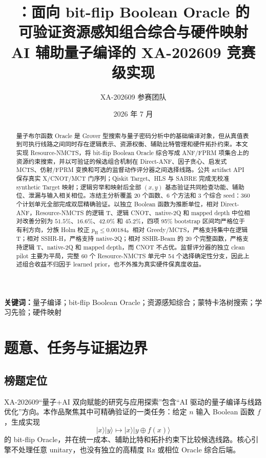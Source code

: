 \documentclass[UTF8,a4paper,12pt]{ctexart}
\title{\method{}：面向 bit-flip Boolean Oracle 的\\
可验证资源感知组合综合与硬件映射\\[0.5em]
{\large AI 辅助量子编译的 XA-202609 竞赛级实现}}
\author{XA-202609 参赛团队}
\date{2026 年 7 月}
\newcommand{\xor}{\ensuremath{\oplus}}
\newcommand{\method}{Resource-NMCTS}
\begin{document}
\maketitle

\begin{abstract}
量子布尔函数 Oracle 是 Grover 型搜索与量子密码分析中的基础编译对象，但从真值表到可执行线路之间同时存在逻辑表示、资源权衡、辅助比特管理和硬件拓扑约束。本文实现 \method{}，将 bit-flip Boolean Oracle 综合写成 ANF/FPRM 项集合上的资源约束搜索，并以可验证的候选组合机制在 Direct-ANF、因子贪心、启发式 MCTS、仿射/FPRM 变换和可选的监督动作评分器之间选择线路。公共 artifact API 保存真实 X/CNOT/MCT 门序列；Qiskit Target、HLS 与 SABRE 完成无校准 synthetic Target 映射；逻辑穷举和映射后全部 $(x,y)$ 基态验证共同检查功能、辅助位、泄漏与输入相关相位。冻结主分析覆盖 20 个函数、6 个方法和 3 个综合 seed：360 个计划单元全部完成双层精确验证。以独立 Boolean 函数为推断单位，相对 Direct-ANF，\method{} 的逻辑 T、逻辑 CNOT、native-2Q 和 mapped depth 中位相对改善分别为 $51.5\%$、$16.6\%$、$42.0\%$ 和 $45.2\%$，四项 95\% bootstrap 区间均严格位于有利方向，分族 Holm 校正 $p_{\mathrm H}\leq0.00184$。相对 Greedy/MCTS，严格支持集中在逻辑 T；相对 SSHR-H，严格支持 native-2Q；相对 SSHR-Beam 的 20 个完整函数，严格支持逻辑 T、native-2Q 和 mapped depth，而 CNOT 不占优。监督评分器的独立 clean pilot 主要为平局，完整 60 个 \method{} 单元中 54 个选择确定性分支，因此上述组合收益不归因于 learned prior，也不外推为真实硬件保真度收益。
\end{abstract}

\noindent\textbf{关键词：}量子编译；bit-flip Boolean Oracle；资源感知综合；蒙特卡洛树搜索；学习先验；硬件映射

\section{题意、任务与证据边界}

\subsection{榜题定位}

XA-202609“量子+AI 双向赋能的研究与应用探索”包含“AI 驱动的量子编译与线路优化”方向。本作品聚焦其中可精确验证的一类任务：给定 $n$ 输入 Boolean 函数 $f$，生成实现
\begin{equation}
  |x\rangle|y\rangle \longmapsto |x\rangle|y\xor f(x)\rangle
  \label{eq:oracle}
\end{equation}
的 bit-flip Oracle，并在统一成本、辅助比特和拓扑约束下比较候选线路。核心引擎不处理任意 unitary，也没有独立的高精度 Rz 或相位 Oracle 综合后端。
\end{document}
